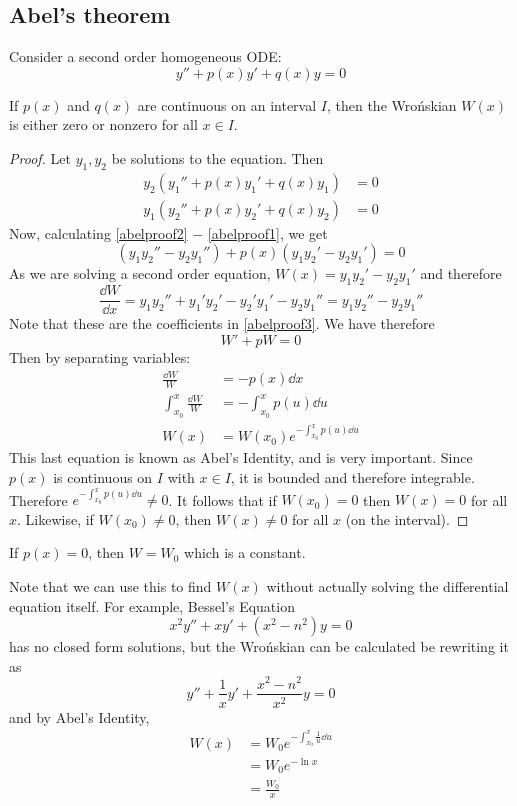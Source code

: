 \subsection{Abel's theorem}
Consider a second order homogeneous ODE:\@
\[
	y'' + p(x)y' + q(x)y = 0
\]
\begin{theorem}
	If \(p(x)\) and \(q(x)\) are continuous on an interval \(I\), then the Wro\'nskian \(W(x)\) is either zero or nonzero for all \(x \in I\).
\end{theorem}
\begin{proof}
	Let \(y_1, y_2\) be solutions to the equation.
	Then
	\begin{align}
		\label{abelproof1} y_2(y_1'' + p(x)y_1' + q(x)y_1) & = 0 \\
		\label{abelproof2} y_1(y_2'' + p(x)y_2' + q(x)y_2) & = 0
	\end{align}
	Now, calculating \eqref{abelproof2} \(-\) \eqref{abelproof1}, we get
	\begin{equation}\label{abelproof3}
		(y_1y_2'' - y_2y_1'') + p(x)(y_1y_2' - y_2y_1') = 0
	\end{equation}
	As we are solving a second order equation, \(W(x) = y_1y_2' - y_2y_1'\) and therefore
	\[
		\frac{\dd{W}}{\dd{x}} = y_1y_2'' + y_1'y_2' - y_2'y_1' - y_2y_1'' = y_1y_2'' - y_2y_1''
	\]
	Note that these are the coefficients in \eqref{abelproof3}.
	We have therefore
	\begin{equation}\label{abelproof4}
		W' + pW = 0
	\end{equation}
	Then by separating variables:
	\begin{align*}
		\frac{\dd{W}}{W}              & = -p(x)\dd{x}                         \\
		\int_{x_0}^x \frac{\dd{W}}{W} & = -\int_{x_0}^x p(u)\dd{u}            \\
		W(x)                          & = W(x_0)e^{-\int_{x_0}^x p(u) \dd{u}}
	\end{align*}
	This last equation is known as Abel's Identity, and is very important.
	Since \(p(x)\) is continuous on \(I\) with \(x \in I\), it is bounded and therefore integrable.
	Therefore \(e^{-\int_{x_0}^x p(u) \dd{u}} \neq 0\).
	It follows that if \(W(x_0) = 0\) then \(W(x) = 0\) for all \(x\).
	Likewise, if \(W(x_0) \neq 0\), then \(W(x) \neq 0\) for all \(x\) (on the interval).
\end{proof}
\begin{corollary}
	If \(p(x) = 0\), then \(W = W_0\) which is a constant.
\end{corollary}
Note that we can use this to find \(W(x)\) without actually solving the differential equation itself.
For example, Bessel's Equation
\[
	x^2y'' + xy' + (x^2 - n^2)y = 0
\]
has no closed form solutions, but the Wro\'nskian can be calculated be rewriting it as
\[
	y'' + \frac{1}{x}y' + \frac{x^2-n^2}{x^2}y = 0
\]
and by Abel's Identity,
\begin{align*}
	W(x) & = W_0 e^{-\int_{x_0}^x \frac{1}{u} \dd{u}} \\
	     & = W_0 e^{-\ln x}                           \\
	     & = \frac{W_0}{x}
\end{align*}

